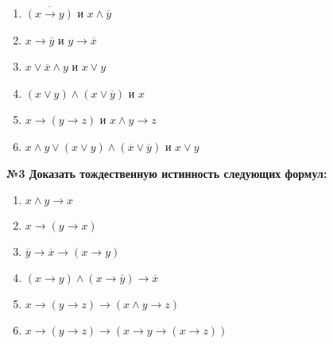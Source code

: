     \begin{minipage}[t]{0.3\textwidth}
        \begin{enumerate}
            \item $\overline {(x \rightarrow y)}$ и $x \wedge \overline y$
            \item $x \rightarrow \overline y$ и $y \rightarrow \overline x$
            \item $x \vee \overline x \wedge y$ и $x \vee y$
        \end{enumerate}
    \end{minipage}
    \begin{minipage}[t]{0.5\textwidth}
        \begin{enumerate}
            \setcounter{enumi}{3}
            \item $(x \vee y) \wedge (x \vee \overline y)$ и $x$
            \item $x \rightarrow (y \rightarrow z)$ и $x \wedge y \rightarrow z$
            \item $x \wedge y \vee (x \vee y) \wedge (\overline x \vee \overline y)$ и $x \vee y$
        \end{enumerate}
    \end{minipage}

    \begin{center}
        \textbf{№3 Доказать тождественную истинность следующих формул:}
    \end{center}

    \begin{minipage}[t]{0.3\textwidth}
        \begin{enumerate}
            \item $x \wedge y \rightarrow x$
            \item $x \rightarrow (y \rightarrow x) $
            \item $\overline y \rightarrow \overline x \rightarrow (x \rightarrow y)$
        \end{enumerate}
    \end{minipage}
    \begin{minipage}[t]{0.6\textwidth}
        \begin{enumerate}
            \setcounter{enumi}{3}
            \item $(x \rightarrow y) \wedge (x \rightarrow \overline y) \rightarrow \overline x$
            \item $x \rightarrow (y \rightarrow z) \rightarrow (x \wedge y \rightarrow z)$
            \item $x \rightarrow (y \rightarrow z) \rightarrow (x \rightarrow y \rightarrow (x \rightarrow z))$
        \end{enumerate}
    \end{minipage}

